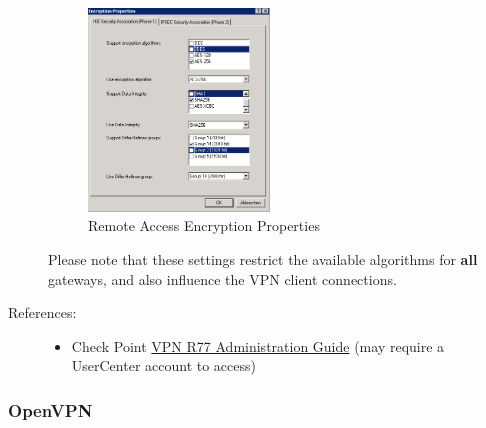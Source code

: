 \begin{description}
\begin{figure}[p]
  \centering
  \includegraphics[width=0.474\textwidth]{checkpoint_4.png}
  \caption{Remote Access Encryption Properties}
  \label{fig:checkpoint_4}
\end{figure}

Please note that these settings restrict the available algorithms for
\textbf{all} gateways, and also influence the VPN client connections.



\item[References:]\mbox{}

\begin{itemize}

\item Check Point
  \href{https://sc1.checkpoint.com/documents/R77/CP_R77_VPN_AdminGuide/html_frameset.htm}{VPN
    R77 Administration Guide} (may require a
  UserCenter account to access)

\end{itemize}


\end{description}


\subsubsection{OpenVPN}

